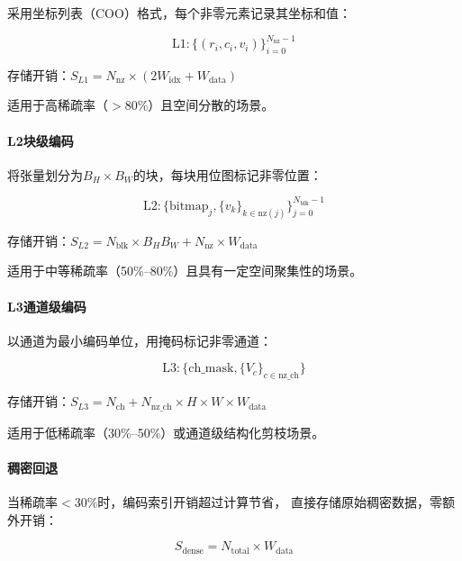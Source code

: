 \documentclass[a4paper,12pt,fontset=ubuntu]{ctexart}
\begin{document}
采用坐标列表（COO）格式，每个非零元素记录其坐标和值：

\begin{equation}
\text{L1}: \{(r_i, c_i, v_i)\}_{i=0}^{N_{\text{nz}}-1}
\end{equation}

存储开销：$S_{L1} = N_{\text{nz}} \times (2W_{\text{idx}} + W_{\text{data}})$

适用于高稀疏率（$>$80\%）且空间分散的场景。

\paragraph{L2块级编码}

将张量划分为$B_H \times B_W$的块，每块用位图标记非零位置：

\begin{equation}
\text{L2}: \{\text{bitmap}_j, \{v_k\}_{k \in \text{nz}(j)}\}_{j=0}^{N_{\text{blk}}-1}
\end{equation}

存储开销：$S_{L2} = N_{\text{blk}} \times B_H B_W + N_{\text{nz}} \times W_{\text{data}}$

适用于中等稀疏率（50\%--80\%）且具有一定空间聚集性的场景。

\paragraph{L3通道级编码}

以通道为最小编码单位，用掩码标记非零通道：

\begin{equation}
\text{L3}: \{\text{ch\_mask}, \{V_c\}_{c \in \text{nz\_ch}}\}
\end{equation}

存储开销：$S_{L3} = N_{\text{ch}} + N_{\text{nz\_ch}} \times H \times W \times W_{\text{data}}$

适用于低稀疏率（30\%--50\%）或通道级结构化剪枝场景。

\paragraph{稠密回退}

当稀疏率$<$30\%时，编码索引开销超过计算节省，
直接存储原始稠密数据，零额外开销：

\begin{equation}
S_{\text{dense}} = N_{\text{total}} \times W_{\text{data}}
\end{equation}
\end{document}
